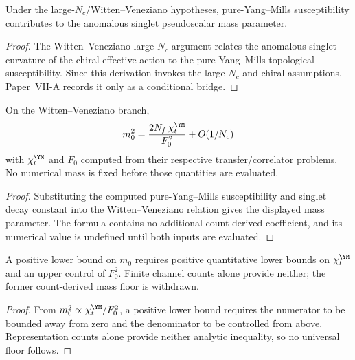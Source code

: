 \documentclass[12pt,a4paper]{article}
\begin{document}
\begin{theorem}
\label{p10:thm:topological-singlet-pseudoscalar-bridge}
Under the large-\(N_c\)/Witten--Veneziano hypotheses, pure-Yang--Mills susceptibility contributes to the anomalous singlet pseudoscalar mass parameter.
\end{theorem}
\begin{proof}
The Witten--Veneziano large-$N_c$ argument relates the anomalous singlet curvature of the chiral effective action to the pure-Yang--Mills topological susceptibility.  Since this derivation invokes the large-$N_c$ and chiral assumptions, Paper~VII-A records it only as a conditional bridge.
\end{proof}

\begin{theorem}
\label{p10:thm:native-anomalous-singlet-pseudoscalar-mass}
On the Witten--Veneziano branch,
\begin{equation}
 m_0^2=\frac{2N_f\,\chi_t^{\YM}}{F_0^2}+O(1/N_c)
\end{equation}
with \(\chi_t^{\YM}\) and \(F_0\) computed from their respective transfer/correlator problems.  No numerical mass is fixed before those quantities are evaluated.
\end{theorem}
\begin{proof}
Substituting the computed pure-Yang--Mills susceptibility and singlet decay constant into the Witten--Veneziano relation gives the displayed mass parameter.  The formula contains no additional count-derived coefficient, and its numerical value is undefined until both inputs are evaluated.
\end{proof}

\begin{corollary}
\label{p10:cor:primitive-u1a-singlet-pseudoscalar-mass-floor}
A positive lower bound on \(m_0\) requires positive quantitative lower bounds on \(\chi_t^{\YM}\) and an upper control of \(F_0^2\).  Finite channel counts alone provide neither; the former count-derived mass floor is withdrawn.
\end{corollary}
\begin{proof}
From $m_0^2\propto\chi_t^{\YM}/F_0^2$, a positive lower bound requires the numerator to be bounded away from zero and the denominator to be controlled from above.  Representation counts alone provide neither analytic inequality, so no universal floor follows.
\end{proof}
\end{document}
